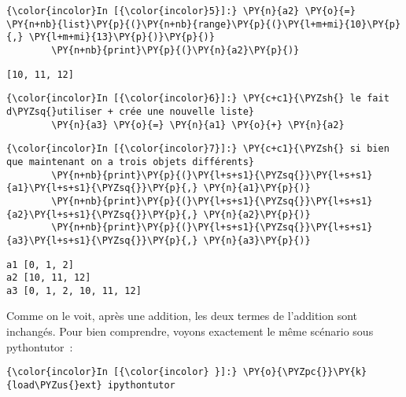     \begin{Verbatim}[commandchars=\\\{\}]
{\color{incolor}In [{\color{incolor}5}]:} \PY{n}{a2} \PY{o}{=} \PY{n+nb}{list}\PY{p}{(}\PY{n+nb}{range}\PY{p}{(}\PY{l+m+mi}{10}\PY{p}{,} \PY{l+m+mi}{13}\PY{p}{)}\PY{p}{)}
        \PY{n+nb}{print}\PY{p}{(}\PY{n}{a2}\PY{p}{)}
\end{Verbatim}


    \begin{Verbatim}[commandchars=\\\{\}]
[10, 11, 12]

    \end{Verbatim}

    \begin{Verbatim}[commandchars=\\\{\}]
{\color{incolor}In [{\color{incolor}6}]:} \PY{c+c1}{\PYZsh{} le fait d\PYZsq{}utiliser + crée une nouvelle liste}
        \PY{n}{a3} \PY{o}{=} \PY{n}{a1} \PY{o}{+} \PY{n}{a2}
\end{Verbatim}


    \begin{Verbatim}[commandchars=\\\{\}]
{\color{incolor}In [{\color{incolor}7}]:} \PY{c+c1}{\PYZsh{} si bien que maintenant on a trois objets différents}
        \PY{n+nb}{print}\PY{p}{(}\PY{l+s+s1}{\PYZsq{}}\PY{l+s+s1}{a1}\PY{l+s+s1}{\PYZsq{}}\PY{p}{,} \PY{n}{a1}\PY{p}{)}
        \PY{n+nb}{print}\PY{p}{(}\PY{l+s+s1}{\PYZsq{}}\PY{l+s+s1}{a2}\PY{l+s+s1}{\PYZsq{}}\PY{p}{,} \PY{n}{a2}\PY{p}{)}
        \PY{n+nb}{print}\PY{p}{(}\PY{l+s+s1}{\PYZsq{}}\PY{l+s+s1}{a3}\PY{l+s+s1}{\PYZsq{}}\PY{p}{,} \PY{n}{a3}\PY{p}{)}
\end{Verbatim}


    \begin{Verbatim}[commandchars=\\\{\}]
a1 [0, 1, 2]
a2 [10, 11, 12]
a3 [0, 1, 2, 10, 11, 12]

    \end{Verbatim}

    Comme on le voit, après une addition, les deux termes de l'addition sont
inchangés. Pour bien comprendre, voyons exactement le même scénario sous
pythontutor~:

    \begin{Verbatim}[commandchars=\\\{\}]
{\color{incolor}In [{\color{incolor} }]:} \PY{o}{\PYZpc{}}\PY{k}{load\PYZus{}ext} ipythontutor
\end{Verbatim}



